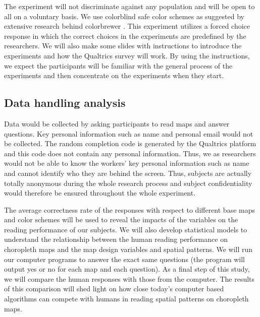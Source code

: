 The experiment will not discriminate against any population and will be open to all on a voluntary basis. We use colorblind safe color schemes as suggested by extensive research behind colorbrewer \citep{harrower2003colorbrewer}. This experiment utilizes a forced choice response in which the correct choices in the experiments are predefined by the researchers. We will also make some slides with instructions to introduce the experiments and how the Qualtrics survey will work. By using the instructions, we expect the participants will be familiar with the general process of the experiments and then concentrate on the experiments when they start. 

\subsection{Data handling analysis}

Data would be collected by asking participants to read maps and answer questions. Key personal information such as name and personal email would not be collected. The random completion code is generated by the Qualtrics platform and this code does not contain any personal information. Thus, we as researchers would not be able to know the workers' key personal information such as name and cannot identify who they are behind the screen. Thus, subjects are actually totally anonymous during the whole research process and subject confidentiality would therefore be ensured throughout the whole experiment.

The average correctness rate of the responses with respect to different base maps and color schemes will be used to reveal the impacts of the variables on the reading performance of our subjects. We will also develop statistical models to understand the relationship between the human reading performance on choropleth maps and the map design variables and spatial patterns. We will run our computer programs to answer the exact same questions (the program will output yes or no for each map and each question). As a final step of this study, we will compare the human responses with those from the computer. The results of this comparison will shed light on how close today's computer based algorithms can compete with humans in reading spatial patterns on choropleth maps. 






